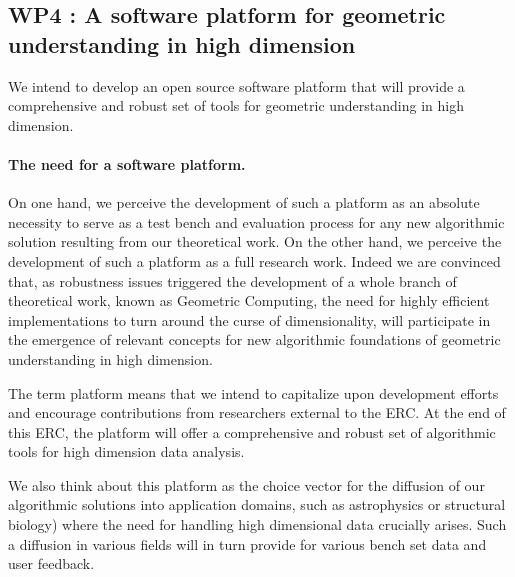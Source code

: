 
\subsection*{WP4 : A software platform for geometric understanding in high
  dimension}

We intend to develop an open source  software platform that will provide a
comprehensive and robust set of tools for geometric understanding in
high
dimension. 

\paragraph{ The need for a software platform.}
On one hand, we perceive the development of such a platform as 
an absolute necessity to serve as a test bench and  evaluation process
for any new algorithmic solution resulting  from  our theoretical work.
On the other hand, we perceive the development of such a platform as
a full research work. Indeed we are convinced that, as robustness
issues triggered the development of a whole branch of theoretical
work, known as Geometric Computing, the need for
highly efficient implementations to turn around the curse of  
dimensionality,  will participate in the emergence of relevant
concepts for new algorithmic foundations
of  geometric understanding in high dimension.


The term platform means that we intend to capitalize
upon development efforts and encourage contributions
from researchers external to the ERC.
 At the end of this ERC,
the platform will offer 
a comprehensive and robust set of algorithmic tools
for high dimension data analysis.

We also think about this platform as the choice
vector for the diffusion of our algorithmic solutions 
into application domains, such as astrophysics
or structural biology) 
 where the need for handling high dimensional
data crucially arises.  Such a diffusion in various fields
 will in turn provide for various bench set data 
and user feedback.



